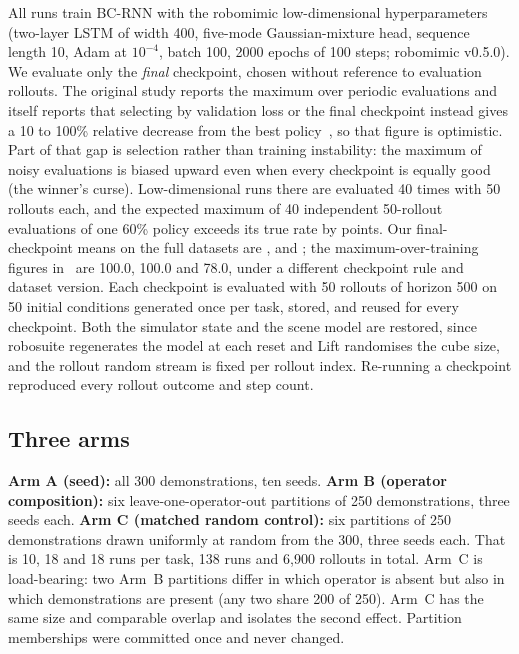 \IfFileExists{IEEEtran.cls}{\documentclass[journal]{IEEEtran}}{\documentclass[10pt,twocolumn]{article}}
\begin{document}
All runs train BC-RNN with the robomimic low-dimensional hyperparameters (two-layer LSTM of width 400, five-mode Gaussian-mixture head, sequence length 10, Adam at $10^{-4}$, batch 100, 2000 epochs of 100 steps; robomimic v0.5.0). We evaluate only the \emph{final} checkpoint, chosen without reference to evaluation rollouts. The original study reports the maximum over periodic evaluations and itself reports that selecting by validation loss or the final checkpoint instead gives a 10 to 100\% relative decrease from the best policy~\cite[Sec.~4.5, Fig.~4a]{mandlekar2021robomimic}, so that figure is optimistic. Part of that gap is selection rather than training instability: the maximum of noisy evaluations is biased upward even when every checkpoint is equally good (the winner's curse). Low-dimensional runs there are evaluated 40 times with 50 rollouts each, and the expected maximum of 40 independent 50-rollout evaluations of one 60\% policy exceeds its true rate by \MaxBiasForty{} points. Our final-checkpoint means on the full datasets are \OneLiftAMean, \OneCanAMean{} and \OneSqAMean; the maximum-over-training figures in~\cite[Table~1]{mandlekar2021robomimic} are 100.0, 100.0 and 78.0, under a different checkpoint rule and dataset version.
Each checkpoint is evaluated with 50 rollouts of horizon 500 on 50 initial conditions generated once per task, stored, and reused for every checkpoint. Both the simulator state and the scene model are restored, since robosuite regenerates the model at each reset and Lift randomises the cube size, and the rollout random stream is fixed per rollout index. Re-running a checkpoint reproduced every rollout outcome and step count.

\subsection{Three arms}
\textbf{Arm A (seed):} all 300 demonstrations, ten seeds. \textbf{Arm B (operator composition):} six leave-one-operator-out partitions of 250 demonstrations, three seeds each. \textbf{Arm C (matched random control):} six partitions of 250 demonstrations drawn uniformly at random from the 300, three seeds each. That is 10, 18 and 18 runs per task, 138 runs and 6{,}900 rollouts in total. Arm~C is load-bearing: two Arm~B partitions differ in which operator is absent but also in which demonstrations are present (any two share 200 of 250). Arm~C has the same size and comparable overlap and isolates the second effect. Partition memberships were committed once and never changed.
\end{document}
